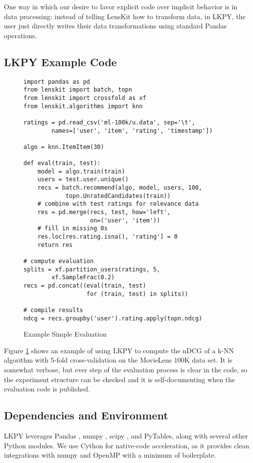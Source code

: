 One way in which our desire to favor explicit code over implicit behavior is in data processing: instead of telling LensKit how to transform data, in LKPY, the user just directly writes their data transformations using standard Pandas operations.

\subsection{LKPY Example Code}

\begin{figure}[tb]
\begin{verbatim}
import pandas as pd
from lenskit import batch, topn
from lenskit import crossfold as xf
from lenskit.algorithms import knn

ratings = pd.read_csv('ml-100k/u.data', sep='\t',
        names=['user', 'item', 'rating', 'timestamp'])

algo = knn.ItemItem(30)

def eval(train, test):
    model = algo.train(train)
    users = test.user.unique()
    recs = batch.recommend(algo, model, users, 100,
            topn.UnratedCandidates(train))
    # combine with test ratings for relevance data
    res = pd.merge(recs, test, how='left',
                   on=('user', 'item'))
    # fill in missing 0s
    res.loc[res.rating.isna(), 'rating'] = 0
    return res

# compute evaluation
splits = xf.partition_users(ratings, 5,
        xf.SampleFrac(0.2)
recs = pd.concat((eval(train, test)
                  for (train, test) in splits))

# compile results
ndcg = recs.groupby('user').rating.apply(topn.ndcg)
\end{verbatim}
\caption{Example Simple Evaluation}
\label{fig:example}
\end{figure}

Figure \ref{fig:example} shows an example of using LKPY to compute the nDCG of a k-NN algorithm with 5-fold cross-validation on the MovieLens 100K data set.
It is somewhat verbose, but ever step of the evaluation process is clear in the code, so the experiment structure can be checked and it is self-documenting when the evaluation code is published.

\subsection{Dependencies and Environment}

LKPY leverages Pandas \citep{McKinney2010-gs}, numpy \citep{Oliphant2006-vd}, scipy \citep{Oliphant2007-ql}, and PyTables, along with several other Python modules.
We use Cython \citep{Behnel2011-uz} for native-code acceleration, as it provides clean integrations with numpy and OpenMP with a minimum of boilerplate.

